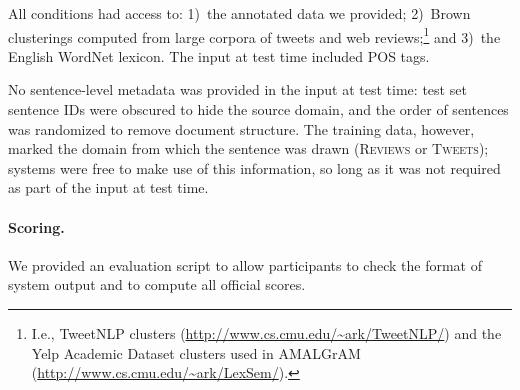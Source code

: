 \documentclass[11pt,letterpaper]{article}
\newcommand{\ensuretext}[1]{#1}
\newcommand{\nssmarker}{\ensuretext{\textcolor{magenta}{\ensuremath{^{\textsc{NS}}_{\textsc{S}}}}}}
\newcommand{\dhmarker}{\ensuretext{\textcolor{red}{\ensuremath{^{\textsc{D}}_{\textsc{H}}}}}}
\newcommand{\arkcomment}[3]{\ensuretext{\textcolor{#3}{[#1 #2]}}}
\newcommand{\nss}[1]{\arkcomment{\nssmarker}{#1}{magenta}}
\newcommand{\dirk}[1]{\arkcomment{\dhmarker}{#1}{red}}
\begin{document}
All conditions had access to: 1)~the annotated data we provided; 
2)~Brown clusterings \citep{brown-92} computed from large corpora of tweets and web reviews;\footnote{I.e., TweetNLP clusters (\url{http://www.cs.cmu.edu/~ark/TweetNLP/}) and 
the Yelp Academic Dataset clusters used in AMALGrAM (\url{http://www.cs.cmu.edu/~ark/LexSem/}).} 
and 3)~the English WordNet lexicon. 
The input at test time included POS tags. 

No sentence-level metadata was provided in the input at test time: 
test set sentence IDs were obscured to hide the source domain, and the order of sentences was randomized 
to remove document structure.
The training data, however, marked the domain from which the sentence was drawn 
(\textsc{Reviews} or \textsc{Tweets}); systems were free to make use of this information, 
so long as it was not required as part of the input at test time.


\paragraph{Scoring.}
We provided an evaluation script to allow participants to check the format of system output and to compute all official scores.
\end{document}
